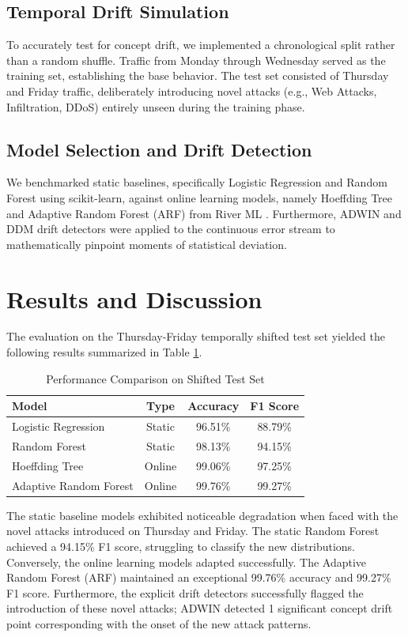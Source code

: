 \documentclass{ieeeaccess}
\begin{document}
\subsection{Temporal Drift Simulation}
To accurately test for concept drift, we implemented a chronological split rather than a random shuffle. Traffic from Monday through Wednesday served as the training set, establishing the base behavior. The test set consisted of Thursday and Friday traffic, deliberately introducing novel attacks (e.g., Web Attacks, Infiltration, DDoS) entirely unseen during the training phase.

\subsection{Model Selection and Drift Detection}
We benchmarked static baselines, specifically Logistic Regression and Random Forest using scikit-learn, against online learning models, namely Hoeffding Tree and Adaptive Random Forest (ARF) from River ML \cite{gomes2017adaptive}. Furthermore, ADWIN and DDM drift detectors were applied to the continuous error stream to mathematically pinpoint moments of statistical deviation.

\section{Results and Discussion}
The evaluation on the Thursday-Friday temporally shifted test set yielded the following results summarized in Table \ref{tab:results}.

\begin{table}[ht]
\caption{Performance Comparison on Shifted Test Set}
\label{tab:results}
\begin{center}
\begin{tabular}{|l|c|c|c|}
\hline
\textbf{Model} & \textbf{Type} & \textbf{Accuracy} & \textbf{F1 Score} \\
\hline
Logistic Regression & Static & 96.51\% & 88.79\% \\
\hline
Random Forest & Static & 98.13\% & 94.15\% \\
\hline
Hoeffding Tree & Online & 99.06\% & 97.25\% \\
\hline
Adaptive Random Forest & Online & 99.76\% & 99.27\% \\
\hline
\end{tabular}
\end{center}
\end{table}

The static baseline models exhibited noticeable degradation when faced with the novel attacks introduced on Thursday and Friday. The static Random Forest achieved a 94.15\% F1 score, struggling to classify the new distributions. Conversely, the online learning models adapted successfully. The Adaptive Random Forest (ARF) maintained an exceptional 99.76\% accuracy and 99.27\% F1 score. Furthermore, the explicit drift detectors successfully flagged the introduction of these novel attacks; ADWIN detected 1 significant concept drift point corresponding with the onset of the new attack patterns.
\end{document}
